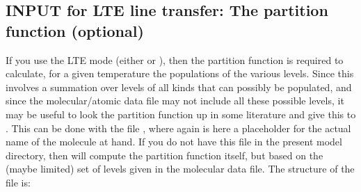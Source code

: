 \documentclass[letterpaper,10pt,english]{sphinxmanual}
\begin{document}
\subsection{INPUT for LTE line transfer: The partition function (optional)}
\label{\detokenize{lineradtrans:input-for-lte-line-transfer-the-partition-function-optional}}\label{\detokenize{lineradtrans:sec-partition-function}}
If you use the LTE mode (either  or ), then the partition function is required to calculate, for
a given temperature the populations of the various levels. Since this
involves a summation over  levels of all kinds that can possibly be
populated, and since the molecular/atomic data file may not include all
these possible levels, it may be useful to look the partition function up in
some literature and give this to . This can be done with
the file , where again 
is here a placeholder for the actual name of the molecule at hand. If you do
not have this file in the present model directory, then 
will compute the partition function itself, but based on the (maybe limited)
set of levels given in the molecular data file. The structure of the
 file is:

\begin{sphinxVerbatim}[commandchars=\\\{\}]
                          
                               
       
       
               
               
               
   
\end{sphinxVerbatim}
\end{document}
